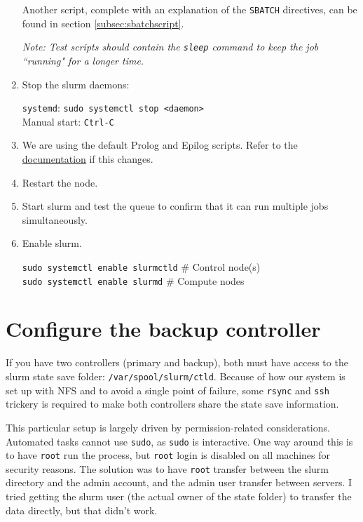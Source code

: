\begin{enumerate}
Another script, complete with an explanation of the \texttt{SBATCH} directives, can be found in section \ref{subsec:sbatchscript}.

\emph{Note: Test scripts should contain the \emph{\texttt{sleep}} command to keep the job ``running" for a longer time.}

\item Stop the slurm daemons: 

	\texttt{systemd}: \texttt{sudo systemctl stop <daemon>} \\
	Manual start: \texttt{Ctrl-C}

\item We are using the default Prolog and Epilog scripts. Refer to the \href{https://slurm.schedmd.com/slurm.conf.html}{documentation} if this changes.

\item Restart the node.
	
\item Start slurm and test the queue to confirm that it can run multiple jobs simultaneously.

\item Enable slurm.

	\texttt{sudo systemctl enable slurmctld} \quad \# Control node(s) \\
	\texttt{sudo systemctl enable slurmd} \quad \# Compute nodes 
	
\end{enumerate}


\section{Configure the backup controller} \label{sec:backupControllerSetup}

If you have two controllers (primary and backup), both must have access to the slurm state save folder: \texttt{/var/spool/slurm/ctld}. Because of how our system is set up with NFS and to avoid a single point of failure, some \texttt{rsync} and \texttt{ssh} trickery is required to make both controllers share the state save information.

This particular setup is largely driven by permission-related considerations. Automated tasks cannot use \texttt{sudo}, as \texttt{sudo} is interactive. One way around this is to have \texttt{root} run the process, but \texttt{root} login is disabled on all machines for security reasons. The solution was to have \texttt{root} transfer between the slurm directory and the admin account, and the admin user transfer between servers. I tried getting the slurm user (the actual owner of the state folder) to transfer the data directly, but that didn't work.

